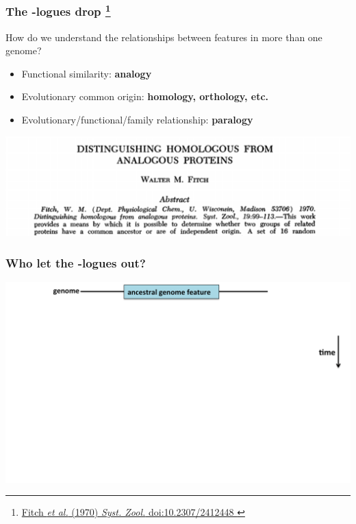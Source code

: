 %
\begin{frame}
  \frametitle{The -logues drop
  \footnote{\tiny{\href{http://dx.doi.org/10.2307/2412448
}{Fitch \textit{et al.} (1970) \textit{Syst. Zool.} doi:10.2307/2412448
}}}
  }
  How do we understand the relationships between features in more than one genome?
  \begin{itemize}
    \item \textcolor{hutton_green}{Functional similarity}: \textbf{analogy}
    \item \textcolor{hutton_blue}{Evolutionary common origin}: \textbf{homology, orthology, etc.}
    \item \textcolor{hutton_purple}{Evolutionary/functional/family relationship}: \textbf{paralogy}
  \end{itemize}
  \begin{center}
    \includegraphics[width=\textwidth]{images/fitch}
  \end{center}    
\end{frame}

% 
\begin{frame}
  \frametitle{Who let the -logues out?}
  \begin{center}
    \includegraphics[width=1\textwidth]{images/logues1}  
  \end{center}  
\end{frame}

